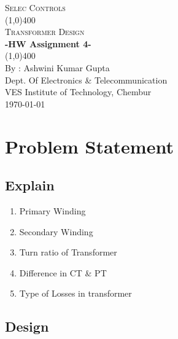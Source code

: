 \documentclass[11pt]{article}
\begin{document}
	
	\begin{titlepage}
		\begin{center}
			\vspace*{1cm}
			\Large{\textsc{Selec Controls}}\\
			\vfill
			\line(1,0){400}\\[1mm]
			\Huge{\textsc{Transformer Design}}\\ [3mm]
			\huge{\textbf{-HW Assignment 4-}}\\ [1mm]
			\line(1,0){400}\\
			\vfill 
			By : Ashwini Kumar Gupta\\
			Dept. Of Electronics \& Telecommunication\\
			VES Institute of Technology, Chembur \\
			\today\\
			
		\end{center}
	\end{titlepage}
	
	\tableofcontents
	\thispagestyle{empty}
	\clearpage
	
	\setcounter{page}{1}
	
	\section{Problem Statement}
		\subsection{Explain}
			\begin{enumerate}
				\item Primary Winding
				\item Secondary Winding
				\item Turn ratio of Transformer
				\item Difference in CT \& PT
				\item Type of Losses in transformer
			\end{enumerate}
	
		\subsection{Design}
			
\end{document}
